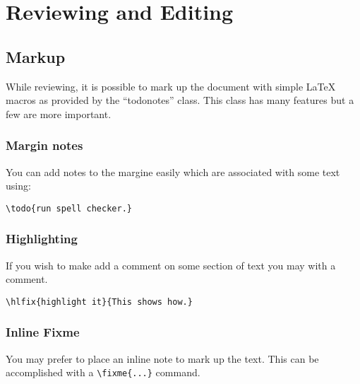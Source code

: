 \chapter{Reviewing and Editing}


\section{Markup}

While reviewing, it is possible to mark up the document with simple
\LaTeX{} macros as provided by the ``todonotes'' class.
This class has many features but a few are more important.


\subsection{Margin notes}

You can add notes to the margine easily which
are associated with some text using:

\begin{verbatim}
\todo{run spell checker.}
\end{verbatim}

\subsection{Highlighting}

If you wish to make add a comment on some section of text you may
with a comment.


\begin{verbatim}
\hlfix{highlight it}{This shows how.}
\end{verbatim}

\subsection{Inline Fixme}

You may prefer to place an inline note to mark up the text.
This can be accomplished with a  \verb|\fixme{...}| command.

